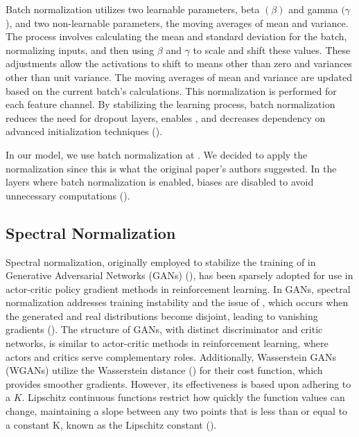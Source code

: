 \bigskip

\noindent Batch normalization utilizes two learnable parameters, beta $(\beta)$ and gamma $(\gamma$), and two non-learnable parameters, the moving averages of mean and variance. The process involves calculating the mean and standard deviation for the batch, normalizing inputs, and then using $\beta$ and $\gamma$ to scale and shift these values. These adjustments allow the activations to shift to means other than zero and variances other than unit variance. The moving averages of mean and variance are updated based on the current batch's calculations. This normalization is performed for each feature channel. By stabilizing the learning process, batch normalization reduces the need for dropout layers, enables , and decreases dependency on advanced initialization techniques (\cite{ioffe2015batch}).

\bigskip

\noindent In our model, we use batch normalization at . We decided to apply the normalization  since this is what the original paper's authors suggested. In the layers where batch normalization is enabled, biases are disabled to avoid unnecessary computations (\cite{goodfellow-batchnorm}).

\subsection{Spectral Normalization} \label{subsec:spectralnorm}

\noindent Spectral normalization, originally employed to stabilize the training of  in Generative Adversarial Networks (GANs) (\cite{miyato2018spectral}), has been sparsely adopted for use in actor-critic policy gradient methods in reinforcement learning. In GANs, spectral normalization addresses training instability and the issue of , which occurs when the generated and real distributions become disjoint, leading to vanishing gradients (\cite{yoshida2017spectral}). The structure of GANs, with distinct discriminator and critic networks, is similar to actor-critic methods in reinforcement learning, where actors and critics serve complementary roles. Additionally, Wasserstein GANs (WGANs) utilize the Wasserstein distance (\cite{wiki:Wasserstein_metric}) for their cost function, which provides smoother gradients. However, its effectiveness is based upon adhering to a  $K$. Lipschitz continuous functions restrict how quickly the function values can change, maintaining a slope between any two points that is less than or equal to a constant K, known as the Lipschitz constant (\cite{wiki:Lipschitz_continuity}).

